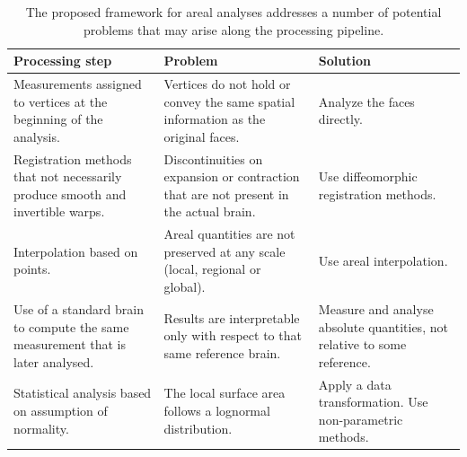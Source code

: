 \begin{table}[!p]
\caption[Problems solved by the proposed method.]{The proposed framework for areal analyses addresses a number of potential problems that may arise along the processing pipeline.}
\begin{center}
{\small
\begin{tabular}{@{}m{42mm}<{\raggedright}m{44mm}<{\raggedright}m{43mm}<{\raggedright}@{}}
\toprule
\textbf{Processing step} &
\textbf{Problem} &
\textbf{Solution} \\
\midrule
Measurements assigned to vertices at the beginning of the analysis. &
Vertices do not hold or convey the same spatial information as the original faces. &
Analyze the faces directly. \\
\midrule
Registration methods that not necessarily produce smooth and invertible warps. &
Discontinuities on expansion or contraction that are not present in the actual brain. &
Use diffeomorphic registration methods. \\
\midrule
Interpolation based on points. &
Areal quantities are not preserved at any scale (local, regional or global). &
Use areal interpolation. \\
\midrule
Use of a standard brain to compute the same measurement that is later analysed. &
Results are interpretable only with respect to that same reference brain. &
Measure and analyse absolute quantities, not relative to some reference. \\
\midrule
Statistical analysis based on assumption of normality. &
The local surface area follows a lognormal distribution. &
Apply a data transformation. Use non-parametric methods. \\
\bottomrule
\end{tabular}}
\end{center}
\label{tab:areal:compare}
\end{table}

